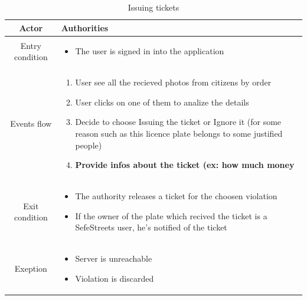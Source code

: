 \documentclass{article}
\begin{document}
		\begin{table} [H]
		\begin{center}
		\caption{Issuing tickets}
		\begin{tabular}{|c|p{8cm}|}
			\hline
			Actor			&	Authorities\\
			\hline
			Entry condition	&	\begin{itemize}[noitemsep,topsep=0pt]
									\item The user is signed in into the application
								\end{itemize}\\
			\hline
			 Events flow		&	\begin{enumerate}[noitemsep,topsep=0pt]
									\item User see all the recieved photos from 
									citizens by order
									\item User clicks on one of them to analize the details
									\item Decide to choose Issuing the ticket or Ignore it 
									(for some reason such as this licence plate belongs to 
									some justified people)
									\item \textbf{Provide infos about the ticket 
									(ex: how much money}
								\end{enumerate}\\
			\hline
			Exit condition	&	\begin{itemize}[noitemsep,topsep=0pt]
									\item The authority releases a ticket for 
									the choosen violation
									\item If the owner of the plate which recived 
									the ticket is a SefeStreets user, he's notified 
									of the ticket
								\end{itemize}\\
			\hline
			Exeption			&	\begin{itemize}[noitemsep,topsep=0pt]
									\item Server is unreachable
									\item Violation is discarded
								\end{itemize}\\
			\hline
		\end{tabular}
		\end{center}
		\end{table} 
		
\end{document}
